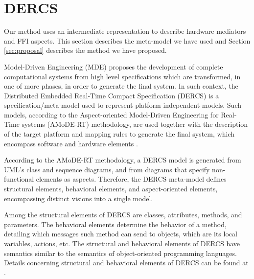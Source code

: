 \section{DERCS} \label{dercs}
Our method uses an intermediate representation to describe hardware mediators and
FFI aspects.
This section describes the meta-model we have used and
Section \ref{sec:proposal} describes the method we have proposed.


Model-Driven Engineering (MDE) proposes the development of complete
computational systems from high level specifications which are transformed,
in one of more phases, in order to generate the final system. %
In such context, the Distributed Embedded Real-Time Compact Specification
(DERCS) is a specification/meta-model used to represent platform independent
models.
Such models, according to the
Aspect-oriented Model-Driven Engineering for Real-Time systems (AMoDE-RT)
methodology, are used together with the description of the target platform and
mapping rules to generate the final system, which encompass software and hardware
elements \cite{Wehrmeister:2009}.

According to the AMoDE-RT methodology,
a DERCS model is generated from UML's class and sequence diagrams, and
from diagrams that specify non-functional elements as aspects.
Therefore, the DERCS meta-model defines
structural elements, behavioral elements, and aspect-oriented elements,
encompassing distinct visions into a single model.

Among the structural elements of DERCS are classes, attributes,
methods, and parameters.
The behavioral elements determine the behavior of a method, detailing which
messages such method can send to objects, which are its
local variables, actions, etc.
The structural and behavioral elements of DERCS have semantics similar to the
semantics of object-oriented programming languages.
Details concerning structural and behavioral elements of DERCS can be found at
\cite{Wehrmeister:2009}.



